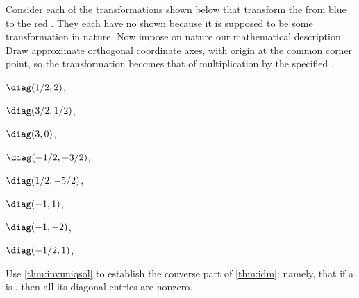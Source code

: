 \begin{exercise}  
Consider each of the transformations shown below that transform the from blue  to the red .
They each have no  shown because it is supposed to be some transformation in nature. 
Now impose on nature our mathematical description.
Draw approximate orthogonal coordinate axes, with origin at the common corner point, so the transformation becomes that of multiplication by the specified .
\begin{Parts}
\item \(\diag(1/2,2)\),

\item \(\diag(3/2,1/2)\),

\item \(\diag(3,0)\),

\item \(\diag(-1/2,-3/2)\),

\item \(\diag(1/2,-5/2)\),

\item \(\diag(-1,1)\),

\item \(\diag(-1,-2)\),

\item \(\diag(-1/2,1)\),

\end{Parts}
\end{exercise}




\begin{exercise} \label{ex:idmc} 
Use \cref{thm:invuniqsol} to establish the converse part of \cref{thm:idm}: namely, that if a  is , then all its diagonal entries are nonzero.
\end{exercise}



